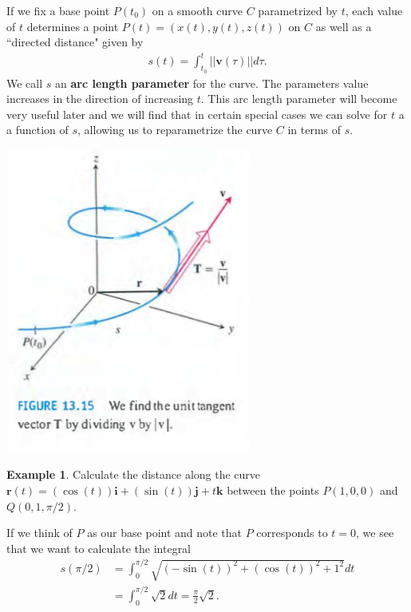 \documentclass[12pt, letter]{article}
\theoremstyle{plain}
\numberwithin{theorem}{section}
\theoremstyle{definition}
\newtheorem{example}[theorem]{Example}
\begin{document}
\bigskip

If we fix a base point $P(t_0)$ on a smooth curve $C$ parametrized by $t$, each value of $t$ determines a point $P(t) = (x(t),y(t),z(t))$ on $C$ as well as a ``directed distance" given by
\begin{align*}
s(t) = \int_{t_0}^t ||\bm{v}(\tau)|| d\tau.
\end{align*}
We call $s$ an \textbf{arc length parameter} for the curve. The parameters value increases in the direction of increasing $t$. This arc length parameter will become very useful later and we will find that in certain special cases we can solve for $t$ a a function of $s$, allowing us to reparametrize the curve $C$ in terms of $s$.

\bigskip

\begin{center}
\includegraphics[scale=0.7]{m1_f28}
\end{center}

\bigskip

\hrulefill

\bigskip

\begin{example}
Calculate the distance along the curve $\bm{r}(t) = (\cos(t))\bm{i} + (\sin(t))\bm{j} + t\bm{k}$ between the points $P(1,0,0)$ and $Q(0,1,\pi/2)$.\\

\smallskip

If we think of $P$ as our base point and note that $P$ corresponds to $t=0$, we see that we want to calculate the integral
\begin{align*}
s(\pi/2) &= \int_0^{\pi/2} \sqrt{(-\sin(t))^2+(\cos(t))^2+1^2}dt\\
&= \int_0^{\pi/2} \sqrt{2}dt = \frac{\pi}{2} \sqrt{2}.
\end{align*}
\end{example}
\end{document}
